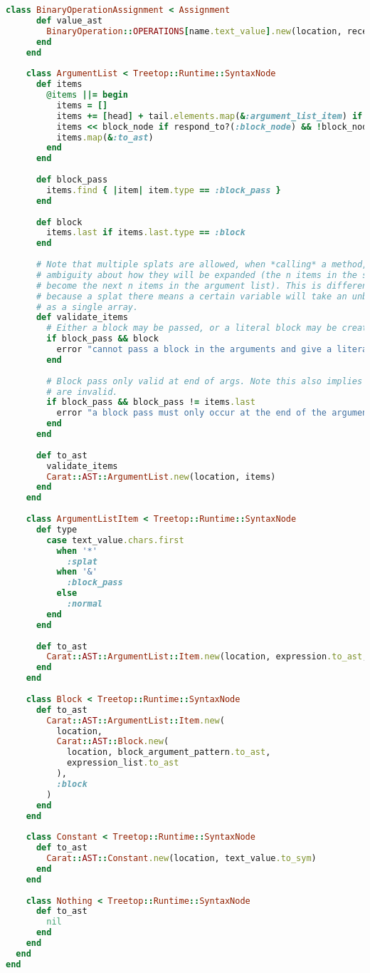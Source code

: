 \begin{lstlisting}[title={\small\ttfamily\bfseries parser/nodes.rb},language=Ruby]
    class BinaryOperationAssignment < Assignment
      def value_ast
        BinaryOperation::OPERATIONS[name.text_value].new(location, receiver_ast, value.to_ast)
      end
    end
    
    class ArgumentList < Treetop::Runtime::SyntaxNode
      def items
        @items ||= begin
          items = []
          items += [head] + tail.elements.map(&:argument_list_item) if respond_to?(:head)
          items << block_node if respond_to?(:block_node) && !block_node.empty?
          items.map(&:to_ast)
        end
      end
      
      def block_pass
        items.find { |item| item.type == :block_pass }
      end
      
      def block
        items.last if items.last.type == :block
      end
      
      # Note that multiple splats are allowed, when *calling* a method, because there is no
      # ambiguity about how they will be expanded (the n items in the splat's expression will
      # become the next n items in the argument list). This is different to when defining a method
      # because a splat there means a certain variable will take an unbounded number of arguments
      # as a single array.
      def validate_items
        # Either a block may be passed, or a literal block may be created, but not both
        if block_pass && block
          error "cannot pass a block in the arguments and give a literal block at the same time"
        end
        
        # Block pass only valid at end of args. Note this also implies that multiple block passes
        # are invalid.
        if block_pass && block_pass != items.last
          error "a block pass must only occur at the end of the argument list"
        end
      end
      
      def to_ast
        validate_items
        Carat::AST::ArgumentList.new(location, items)
      end
    end
    
    class ArgumentListItem < Treetop::Runtime::SyntaxNode
      def type
        case text_value.chars.first
          when '*'
            :splat
          when '&'
            :block_pass
          else
            :normal
        end
      end
      
      def to_ast
        Carat::AST::ArgumentList::Item.new(location, expression.to_ast, type)
      end
    end
    
    class Block < Treetop::Runtime::SyntaxNode
      def to_ast
        Carat::AST::ArgumentList::Item.new(
          location,
          Carat::AST::Block.new(
            location, block_argument_pattern.to_ast,
            expression_list.to_ast
          ),
          :block
        )
      end
    end
    
    class Constant < Treetop::Runtime::SyntaxNode
      def to_ast
        Carat::AST::Constant.new(location, text_value.to_sym)
      end
    end
    
    class Nothing < Treetop::Runtime::SyntaxNode
      def to_ast
        nil
      end
    end
  end
end

\end{lstlisting}
